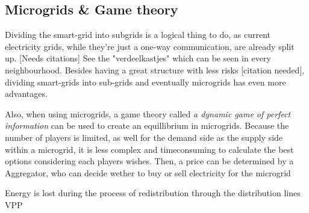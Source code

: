 \subsection{Microgrids \& Game theory}
Dividing the smart-grid into subgrids is a logical thing to do, as current electricity grids, while they're just a one-way communication, are already split up. [Needs citations] See the "verdeelkastjes" which can be seen in every neighbourhood. Besides having a great structure with less risks [citation needed], dividing smart-grids into sub-grids and eventually microgrids %
has even more advantages. %


Also, when using microgrids, a game theory called \emph{a dynamic game of perfect information} %
 can be used to create an equillibrium in microgrids. Because the number of players is limited, as well for the demand side as the supply side within a microgrid, it is less complex and timeconsuming to calculate the best options considering each players wishes. Then, a price can be determined by a Aggregator, who can decide wether to buy or sell electricity for the microgrid \cite{MicrogridModellingPetrosAristidou}


Energy is lost during the process of redistribution through the distribution lines
VPP